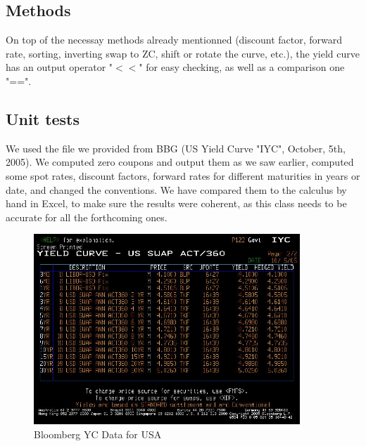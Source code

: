 \subsection{Methods}

\par On top of the necessay methods already mentionned (discount factor, forward rate, sorting, inverting swap to ZC, shift or rotate the curve, etc.), the yield curve has an output operator "$<<$" for easy checking, as well as a comparison one "==".

\subsection{Unit tests}

\par We used the file we provided from BBG (US Yield Curve "IYC", October, 5th, 2005). We computed zero coupons and output them as we saw earlier, computed some spot rates, discount factors, forward rates for different maturities in years or date, and changed the conventions. We have compared them to the calculus by hand in Excel, to make sure the results were coherent, as this class needs to be accurate for all the forthcoming ones.

\begin{figure}[htbp]
\begin{center}
        \includegraphics[width=10cm]{YC_RATES.jpg}
        \caption{Bloomberg YC Data for USA}
\end{center}
\end{figure}


